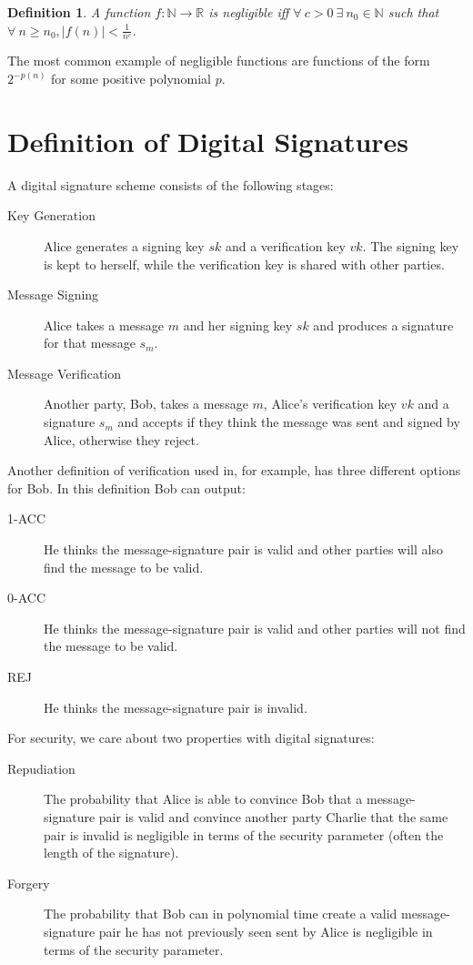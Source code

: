 \documentclass[%
 reprint,
 amsmath,amssymb,
 aps,
 pra,
]{revtex4-1}
\newtheorem{definition}{Definition}[section]
\begin{document}
\begin{definition}
A function $f:\mathbb{N}\rightarrow\mathbb{R}$ is negligible iff $\forall~ c > 0 ~\exists~ n_0 \in \mathbb{N}$ such that $\forall~ n \geq n_0, |f(n)| < \frac{1}{n^c}$.
\end{definition}

The most common example of negligible functions are functions of the form $2^{-p(n)}$ for some positive polynomial $p$.

\section{Definition of Digital Signatures}
\label{sec:def}

A digital signature scheme consists of the following stages:

\begin{description}
\item[Key Generation]Alice generates a signing key $sk$ and a verification key $vk$. The signing key is kept to herself, while the verification key is shared with other parties.
\item[Message Signing]Alice takes a message $m$ and her signing key $sk$ and produces a signature for that message $s_m$.
\item[Message Verification]Another party, Bob, takes a message $m$, Alice's verification key $vk$ and a signature $s_m$ and accepts if they think the message was sent and signed by Alice, otherwise they reject.
\end{description}

Another definition of verification used in, for example, \cite{quant-ph/0105032} has three different options for Bob. In this definition Bob can output:

\begin{description}
\item[1-ACC]He thinks the message-signature pair is valid and other parties will also find the message to be valid.
\item[0-ACC]He thinks the message-signature pair is valid and other parties will not find the message to be valid.
\item[REJ]He thinks the message-signature pair is invalid.
\end{description}

For security, we care about two properties with digital signatures:

\begin{description}
\item[Repudiation]The probability that Alice is able to convince Bob that a message-signature pair is valid and convince another party Charlie that the same pair is invalid is negligible in terms of the security parameter (often the length of the signature).
\item[Forgery]The probability that Bob can in polynomial time create a valid message-signature pair he has not previously seen sent by Alice is negligible in terms of the security parameter.
\end{description}
\end{document}
